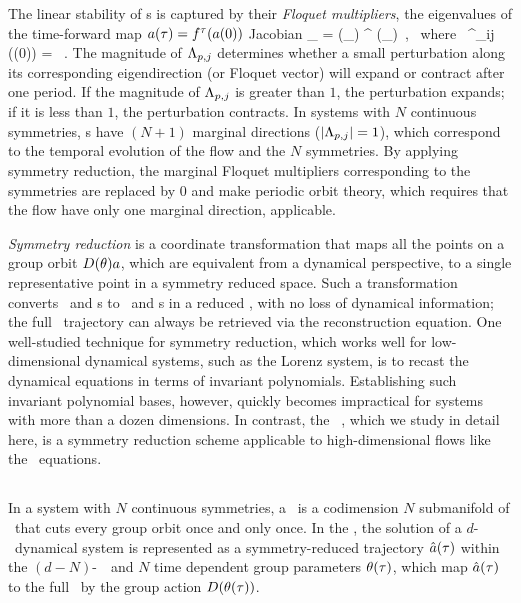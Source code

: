 \documentclass[aip,cha,
reprint,
secnumarabic,
nofootinbib, tightenlines,
nobibnotes, showkeys, showpacs,
superscriptaddress,
]{revtex4-1}
\begin{document}
The linear stability of \rpo s is captured by their \emph{Floquet
multipliers}, the eigenvalues of the time-forward map
$a(\tau)={f^{\tau}(a(0))}$ Jacobian
\beq
\jMpsRed_{\rpprime}
= \matrixRep(\theta_\rpprime ) \jMps^\period{\rpprime} (\ssp_\rpprime)
\,, \; \mbox{~where~}\;
\jMps^{\zeit}_{ij} (\ssp(0)) = \, .
The magnitude of $\Lambda_{p,j}$ determines whether a small perturbation
along its corresponding eigendirection (or Floquet vector) will expand or
contract after one period. If the magnitude of $\Lambda_{p,j}$ is
greater than $1$, the perturbation expands; if it is less than $1$, the
perturbation contracts. In systems with $N$ continuous symmetries, \rpo s
have $(N+1)$ marginal directions ($\left|\Lambda_{p,j}\right| = 1$),
which correspond to the temporal evolution of the flow and the $N$
symmetries. By applying symmetry reduction, the marginal Floquet
multipliers corresponding to the symmetries are replaced by $0$ and make
periodic orbit theory, which requires that the flow have only one
marginal direction, applicable.

\emph{Symmetry reduction} is a coordinate transformation that maps all the 
points on a group orbit ${D}(\theta) a$, which are equivalent from 
a dynamical perspective, to a single representative point in a symmetry 
reduced space. Such a transformation converts \reqva\ and \rpo s to \eqva\ and 
\po s in a reduced \statesp, with no loss of dynamical information; the full 
\statesp\ trajectory can always be retrieved via the reconstruction equation. 
One well-studied technique for symmetry reduction, which works well for 
low-dimensional dynamical systems, such as the Lorenz system, is to recast the 
dynamical equations in terms of invariant polynomials. 
Establishing such invariant polynomial bases, however, quickly becomes 
impractical for systems with more than a dozen dimensions. In 
contrast, the \mslices\ 
,
which we study in detail here, is a symmetry reduction scheme applicable to
high-dimensional flows like the \NS\ equations\rf{WiShCv14}.

\subsection{\Mslices}
\label{s-slice}

In a system with $N$ continuous symmetries, a \emph{\slice} \pSRed\ is a codimension $N$ submanifold
of \pS\ that cuts every group orbit once and only once. In the \emph{\mslices}, the solution
of a $d$-\dmn\ dynamical system is represented as a symmetry-reduced trajectory $\hat{a} (\tau)$ within the
$(d-N)$-\dmn\ \slice\ and $N$ time dependent group parameters $\theta(\tau)$, which
map $\hat{a} (\tau)$ to the full \statesp\ by the group action ${D}(\theta(\tau))$.
\end{document}
